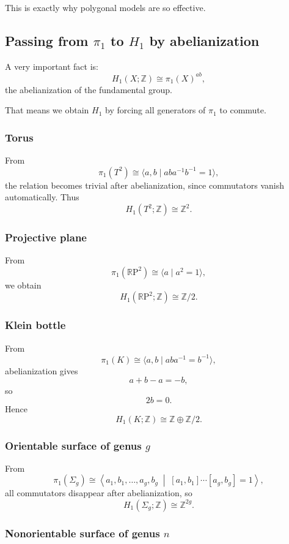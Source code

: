 \documentclass[12pt,a4paper]{article}
\newcommand{\RP}{\mathbb{R}\mathrm{P}}
\newcommand{\Z}{\mathbb{Z}}
\theoremstyle{notespace}
\begin{document}
This is exactly why polygonal models are so effective.

\subsection{Passing from \(\pi_1\) to \(H_1\) by abelianization}

A very important fact is:
\[
H_1(X;\Z)\cong \pi_1(X)^{ab},
\]
the abelianization of the fundamental group.

That means we obtain \(H_1\) by forcing all generators of \(\pi_1\) to commute.

\subsubsection*{Torus}

From
\[
\pi_1(T^2)\cong \langle a,b\mid aba^{-1}b^{-1}=1\rangle,
\]
the relation becomes trivial after abelianization, since commutators vanish automatically. Thus
\[
H_1(T^2;\Z)\cong \Z^2.
\]

\subsubsection*{Projective plane}

From
\[
\pi_1(\RP^2)\cong \langle a\mid a^2=1\rangle,
\]
we obtain
\[
H_1(\RP^2;\Z)\cong \Z/2.
\]

\subsubsection*{Klein bottle}

From
\[
\pi_1(K)\cong \langle a,b\mid aba^{-1}=b^{-1}\rangle,
\]
abelianization gives
\[
a+b-a=-b,
\]
so
\[
2b=0.
\]
Hence
\[
H_1(K;\Z)\cong \Z\oplus \Z/2.
\]

\subsubsection*{Orientable surface of genus \(g\)}

From
\[
\pi_1(\Sigma_g)\cong
\left\langle
a_1,b_1,\dots,a_g,b_g
\;\middle|\;
[a_1,b_1]\cdots [a_g,b_g]=1
\right\rangle,
\]
all commutators disappear after abelianization, so
\[
H_1(\Sigma_g;\Z)\cong \Z^{2g}.
\]

\subsubsection*{Nonorientable surface of genus \(n\)}
\end{document}
